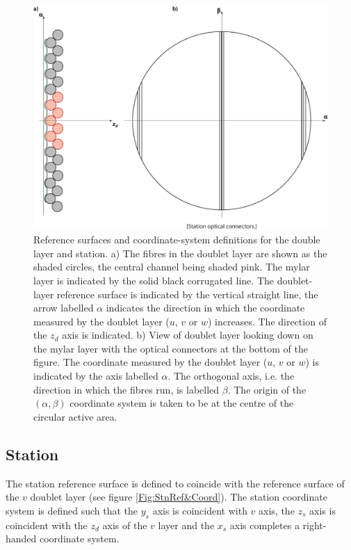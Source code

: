\begin{figure}
  \begin{center}
    \includegraphics[width=0.7\linewidth] {detectors/tracker/03-Reference-surfaces-and-coordinate-systems/Figures/doublet-layer.pdf}
  \end{center}
  \caption{ Reference surfaces and coordinate-system definitions for the double layer and station. a) The fibres in the doublet layer are shown as the shaded circles, the central channel being shaded pink. The mylar layer is indicated by the solid black corrugated line. The doublet-layer reference surface is indicated by the vertical straight line, the arrow labelled $\alpha$ indicates the direction in which the coordinate measured by the doublet layer ($u$, $v$ or $w$) increases. The direction of the $z_d$ axis is indicated. b) View of doublet layer looking down on the mylar layer with the optical connectors at the bottom of the figure. The coordinate measured by the doublet layer ($u$, $v$ or $w$) is indicated by the axis labelled $\alpha$. The orthogonal axis, i.e. the direction in which the fibres run, is labelled $\beta$. The origin of the $(\alpha, \beta)$ coordinate system is taken to be at the centre of the circular active area.}
  \label{Fig:DblLyrRef&Coord}
\end{figure}

\subsection{Station}
\label{SubSect:SciFiRefCoordStn}

The station reference surface is defined to coincide with the reference surface of the $v$ doublet layer (see figure \ref{Fig:StnRef&Coord}). The station coordinate system is defined such that the $y_s$ axis is coincident with $v$ axis, the $z_s$ axis is coincident with the $z_d$ axis of the $v$ layer and the $x_s$ axis completes a right-handed coordinate system.

